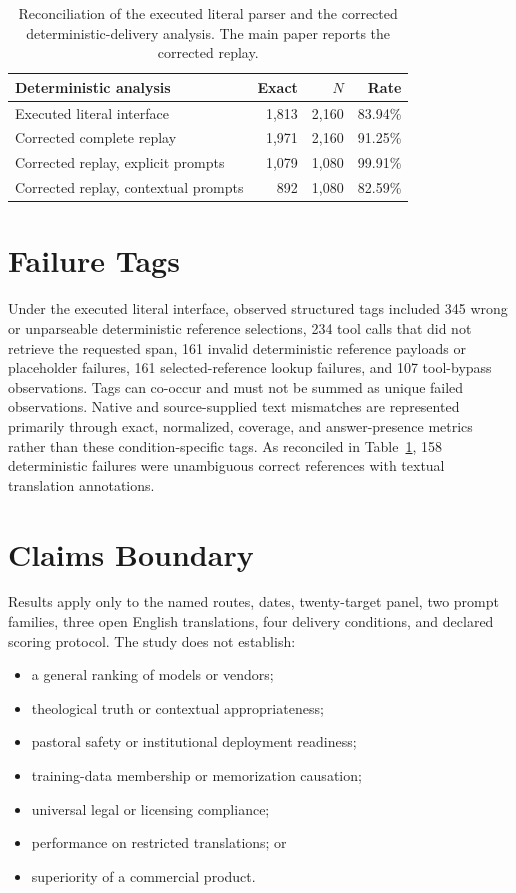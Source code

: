 \documentclass[11pt]{article}
\begin{document}
\begin{table}[h]
\centering
\small
\begin{tabular}{lrrr}
\toprule
Deterministic analysis & Exact & $N$ & Rate \\
\midrule
Executed literal interface & 1,813 & 2,160 & 83.94\% \\
Corrected complete replay & 1,971 & 2,160 & 91.25\% \\
Corrected replay, explicit prompts & 1,079 & 1,080 & 99.91\% \\
Corrected replay, contextual prompts & 892 & 1,080 & 82.59\% \\
\bottomrule
\end{tabular}
\caption{Reconciliation of the executed literal parser and the corrected
deterministic-delivery analysis. The main paper reports the corrected replay.}
\label{tab:parser-audit}
\end{table}

\section{Failure Tags}
\label{app:failure-tags}

Under the executed literal interface, observed structured tags included 345
wrong or unparseable deterministic reference selections, 234 tool calls that
did not retrieve the requested span, 161 invalid deterministic reference
payloads or placeholder failures, 161
selected-reference lookup failures, and 107 tool-bypass observations. Tags
can co-occur and must not be summed as unique failed observations. Native and
source-supplied text mismatches are represented primarily through exact,
normalized, coverage, and answer-presence metrics rather than these
condition-specific tags. As reconciled in
Table~\ref{tab:parser-audit}, 158 deterministic failures were unambiguous
correct references with textual translation annotations.

\section{Claims Boundary}
\label{app:claims}

Results apply only to the named routes, dates, twenty-target panel, two prompt
families, three open English translations, four delivery conditions, and
declared scoring protocol. The study does not establish:

\begin{itemize}[leftmargin=*,topsep=4pt,itemsep=2pt]
  \item a general ranking of models or vendors;
  \item theological truth or contextual appropriateness;
  \item pastoral safety or institutional deployment readiness;
  \item training-data membership or memorization causation;
  \item universal legal or licensing compliance;
  \item performance on restricted translations; or
  \item superiority of a commercial product.
\end{itemize}



\end{document}
